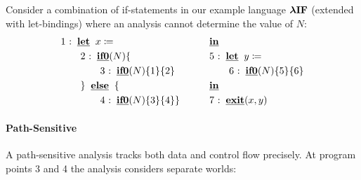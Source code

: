 Consider a combination of if-statements in our example language
$ \operatorname{\mathtt{\boldsymbol{\mathbf{\lambda{}IF}}}} $ (extended with let-bindings) where an analysis
cannot determine the value of $N$: \small\begin{alignat*}{3}

& 1 \mathbin{\colon}   \keyword{let}\;\;  x  \coloneqq            &&  \hspace{1em}  \hspace{1em}  \keyword{in}                  \\
&  \hspace{1em}  \hspace{1em} 2 \mathbin{\colon}   \keyword{if0} (N) \{           &&  \hspace{1em}  \hspace{1em} 5 \mathbin{\colon}   \keyword{let}\;\;  y  \coloneqq         \\
&  \hspace{1em}  \hspace{1em}  \hspace{1em}  \hspace{1em} 3 \mathbin{\colon}   \keyword{if0} (N) \{ 1 \}  \{ 2 \}    &&  \hspace{1em}  \hspace{1em}  \hspace{1em}  \hspace{1em} 6 \mathbin{\colon}   \keyword{if0} (N) \{ 5 \}  \{ 6 \}   \\
&  \hspace{1em}  \hspace{1em}  \}   \;\;\keyword{\litelse}\;\;   \{             &&  \hspace{1em}  \hspace{1em}  \keyword{in}                  \\
&  \hspace{1em}  \hspace{1em}  \hspace{1em}  \hspace{1em} 4 \mathbin{\colon}   \keyword{if0} (N) \{ 3 \}  \{ 4 \}   \}  &&  \hspace{1em}  \hspace{1em} 7 \mathbin{\colon}   \keyword{exit} (x, y)

\end{alignat*}\normalsize \paragraph{Path-Sensitive} A path-sensitive
analysis tracks both data and control flow precisely. At program points
3 and 4 the analysis considers separate worlds:

